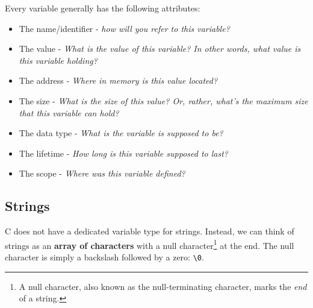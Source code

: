 \documentclass[letterpaper]{article}
\begin{document}
\bigskip 

Every variable generally has the following attributes:
\begin{itemize}
    \item The name/identifier - \emph{how will you refer to this variable?}
    \item The value - \emph{What is the value of this variable? In other words, what value is this variable holding?}
    \item The address - \emph{Where in memory is this value located?}
    \item The size - \emph{What is the size of this value? Or, rather, what's the maximum size that this variable can hold?}
    \item The data type - \emph{What is the variable is supposed to be?}
    \item The lifetime - \emph{How long is this variable supposed to last?}
    \item The scope - \emph{Where was this variable defined?}
\end{itemize}

\subsection{Strings}
C does not have a dedicated variable type for strings. Instead, we can think of strings as an \textbf{array of characters} with a null character\footnote{A null character, also known as the null-terminating character, marks the \emph{end} of a string.} at the end. The null character is simply a backslash followed by a zero: \verb"\0".

\bigskip 
\end{document}
